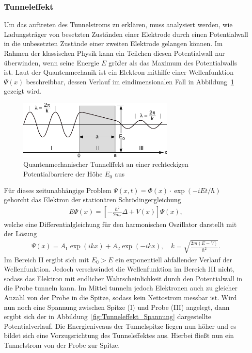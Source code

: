 \documentclass[a4paper,twoside,final]{article}
\begin{document}
\subsubsection{Tunneleffekt}
Um das auftreten des Tunnelstroms zu erklären, muss analysiert werden, wie Ladungsträger von besetzten Zuständen einer Elektrode durch einen Potentialwall in die unbesetzten Zustände einer zweiten Elektrode gelangen können. Im Rahmen der klassischen Physik kann ein Teilchen diesen Potentialwall nur überwinden, wenn seine Energie $E$ größer als das Maximum des Potentialwalls ist. Laut der Quantenmechanik ist ein Elektron mithilfe einer Wellenfunktion $\Psi(x)$ beschreibbar, dessen Verlauf im eindimensionalen Fall in Abbildung~\ref{fig:Tunneleffekt} gezeigt wird.
\begin{figure}[htp]
    \centering
    \includegraphics[width=0.7\textwidth]{Bilder/Tunneleffekt.pdf}
    \caption{Quantenmechanischer Tunnelffekt an einer rechteckigen Potentialbarriere der Höhe $E_0$ aus~\cite{Demtroeder}}
    \label{fig:Tunneleffekt}
\end{figure}
Für dieses zeitunabhängige Problem $\Psi(x,t) = \Phi(x)\cdot\exp(-iEt/\hbar)$ gehorcht das Elektron der stationären Schrödingergleichung
\begin{align}
  E \Psi(x) = \left[-\frac{\hbar^2}{2m_e}\Delta + V(x)\right] \Psi(x),
\end{align}
welche eine Differentialgleichung für den harmonischen Oszillator darstellt mit der Lösung
\begin{align}
  \Psi(x) = A_1 \exp(ikx) + A_2 \exp(-ikx), \quad k=\sqrt{\frac{2m(E-V)}{\hbar^2}}.
\end{align}
Im Bereich II ergibt sich mit $E_0 > E$ ein exponentiell abfallender Verlauf der Wellenfunktion. Jedoch verschwindet die Wellenfunktion im Bereich III nicht, sodass das Elektron mit endlicher Wahrscheinlichkeit durch den Potentialwall in die Probe tunneln kann. Im Mittel tunneln jedoch Elektronen auch zu gleicher Anzahl von der Probe in die Spitze, sodass kein Nettostrom messbar ist. Wird nun noch eine Spannung zwischen Spitze (I) und Probe (III) angelegt, dann ergibt sich der in Abbildung~\ref{fig:Tunneleffekt_Spannung} dargestellte Potentialverlauf. Die Energieniveaus der Tunnelspitze liegen nun höher und es bildet sich eine Vorzugsrichtung des Tunneleffektes aus. Hierbei fließt nun ein Tunnelstrom von der Probe zur Spitze.
\end{document}
